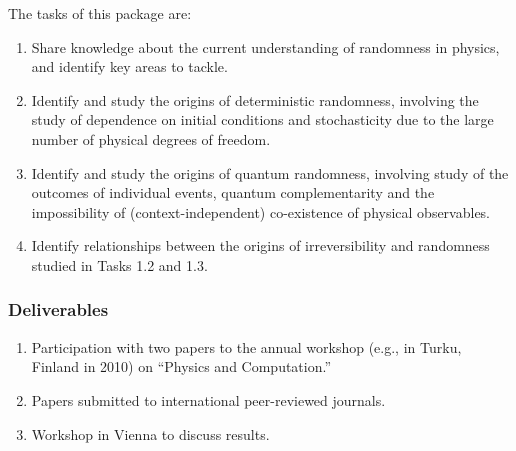 \documentclass[12pt]{article}
\begin{document}
The tasks of this package are:
\begin{enumerate}[label=Task
1.\arabic{enumi}:,leftmargin=3\parindent, labelindent=0pt, labelsep=*]
	\item Share knowledge about the current understanding of randomness in physics, and identify key areas to tackle.
	\item Identify and study the origins of deterministic randomness, involving the study of dependence on initial conditions and stochasticity due to the large number of physical degrees of freedom.
	\item Identify and study the origins of quantum randomness, involving study of the outcomes of individual events, quantum complementarity and the impossibility of (context-independent) co-existence of physical observables.
	\item Identify relationships between the origins of irreversibility and randomness studied in Tasks 1.2 and 1.3.
\end{enumerate}


%
%
%
%
%


\subsubsection*{Deliverables}

\renewcommand{\labelenumi}{D1.\arabic{enumi}:}
\begin{enumerate}

\item
Participation with two papers to the annual workshop (e.g., in Turku, Finland in 2010) on ``Physics and Computation.''
\item Papers submitted to international peer-reviewed journals.

\item Workshop in Vienna to discuss results.


\end{enumerate}
\end{document}
